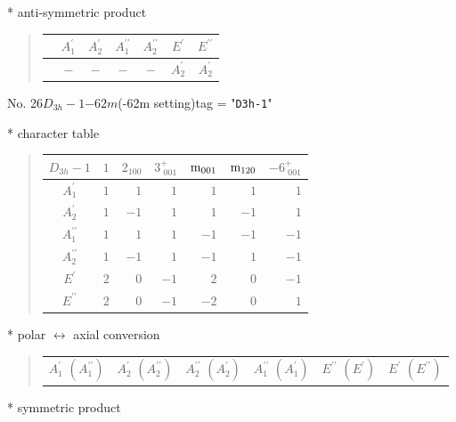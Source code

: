 \documentclass[fleqn,10pt,landscape]{jsarticle}
\begin{document}
* anti-symmetric product
\begin{quote}
\begin{tabular}{ccccccc} \hline \hline
 & $ A_{1}^{\prime} $ & $ A_{2}^{\prime} $ & $ A_{1}^{\prime\prime} $ & $ A_{2}^{\prime\prime} $ & $ E^{\prime} $ & $ E^{\prime\prime} $ \\ \hline
$  $ & $ - $ & $ - $ & $ - $ & $ - $ & $ A_{2}^{\prime} $ & $ A_{2}^{\prime} $ \\
 \hline \hline
\end{tabular}
\end{quote}
\newpage
No. 26\quad$D_{3h}-1$\quad$-62m$\quad(-62m setting)\quad[ hexagonal ]
tag = "{\tt D3h-1}"

* character table
\begin{quote}
\begin{tabular}{crrrrrr} \hline \hline
$ D_{3h}-1 $ & $ 1 $ & $ 2{}_{100} $ & $ 3^{+}_{\,\,001} $ & $ {\rm m}_{001} $ & $ {\rm m}_{120} $ & $ -6^{+}_{\,\,001} $ \\ \hline
$ A_{1}^{\prime} $ & $ 1 $ & $ 1 $ & $ 1 $ & $ 1 $ & $ 1 $ & $ 1 $ \\
$ A_{2}^{\prime} $ & $ 1 $ & $ -1 $ & $ 1 $ & $ 1 $ & $ -1 $ & $ 1 $ \\
$ A_{1}^{\prime\prime} $ & $ 1 $ & $ 1 $ & $ 1 $ & $ -1 $ & $ -1 $ & $ -1 $ \\
$ A_{2}^{\prime\prime} $ & $ 1 $ & $ -1 $ & $ 1 $ & $ -1 $ & $ 1 $ & $ -1 $ \\
$ E^{\prime} $ & $ 2 $ & $ 0 $ & $ -1 $ & $ 2 $ & $ 0 $ & $ -1 $ \\
$ E^{\prime\prime} $ & $ 2 $ & $ 0 $ & $ -1 $ & $ -2 $ & $ 0 $ & $ 1 $ \\
 \hline \hline
\end{tabular}
\end{quote}
* polar $\leftrightarrow$ axial conversion
\begin{quote}
\begin{tabular}{cccccc}
$ A_{1}^{\prime}\,\,(A_{1}^{\prime\prime}) $ & $ A_{2}^{\prime}\,\,(A_{2}^{\prime\prime}) $ & $ A_{2}^{\prime\prime}\,\,(A_{2}^{\prime}) $ & $ A_{1}^{\prime\prime}\,\,(A_{1}^{\prime}) $ & $ E^{\prime\prime}\,\,(E^{\prime}) $ & $ E^{\prime}\,\,(E^{\prime\prime}) $
\end{tabular}
\end{quote}
* symmetric product
\end{document}
